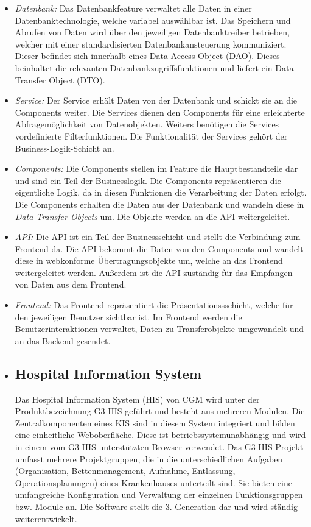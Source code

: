  \begin{itemize}
	


\item \textit {Datenbank:} Das Datenbankfeature verwaltet alle Daten in einer Datenbanktechnologie, welche variabel auswählbar ist. Das Speichern und Abrufen von Daten wird über den jeweiligen Datenbanktreiber betrieben, welcher mit einer standardisierten Datenbankansteuerung kommuniziert. Dieser befindet sich innerhalb eines Data Access Object (DAO). Dieses beinhaltet die relevanten Datenbankzugriffsfunktionen und liefert ein Data Transfer Object (DTO).\\
\item \textit{Service:} Der Service erhält Daten von der Datenbank und schickt sie an die Components weiter. Die Services dienen den Components für eine erleichterte Abfragemöglichkeit von Datenobjekten. Weiters benötigen die Services vordefinierte Filterfunktionen. Die Funktionalität der Services gehört der Business-Logik-Schicht an.\\
\item \textit{Components:} Die Components stellen im Feature die Hauptbestandteile dar und sind ein Teil der Businesslogik. Die Components repräsentieren die eigentliche Logik, da in diesen Funktionen die Verarbeitung der Daten erfolgt. Die Components erhalten die Daten aus der Datenbank und wandeln diese in \textit{Data Transfer Objects} um. Die Objekte werden an die API weitergeleitet.\\
\item \textit{API:} Die API ist ein Teil der Businessschicht und stellt die Verbindung zum Frontend da. Die API bekommt die Daten von den Components und wandelt diese in webkonforme Übertragungsobjekte um, welche an das Frontend weitergeleitet werden. Außerdem ist die API zuständig für das Empfangen von Daten aus dem Frontend.\\
\item \textit{Frontend:} Das Frontend repräsentiert die Präsentationssschicht, welche für den jeweiligen Benutzer sichtbar ist. Im Frontend werden die Benutzerinteraktionen verwaltet, Daten zu Transferobjekte umgewandelt und an das Backend gesendet. \\
\item \subsection{Hospital Information System}
Das Hospital Information System (HIS) von CGM wird unter der Produktbezeichnung G3 HIS geführt und besteht aus mehreren Modulen. Die Zentralkomponenten eines KIS sind in diesem System integriert und bilden eine einheitliche Weboberfläche. Diese ist betriebssystemunabhängig und wird in einem vom G3 HIS unterstützten Browser verwendet. Das G3 HIS Projekt umfasst mehrere Projektgruppen, die in die unterschiedlichen Aufgaben (Organisation, Bettenmanagement, Aufnahme, Entlassung, Operationsplanungen) eines Krankenhauses unterteilt sind. Sie bieten eine umfangreiche Konfiguration und Verwaltung der einzelnen Funktionsgruppen bzw. Module an. Die Software stellt die 3. Generation dar und wird ständig weiterentwickelt.
\end{itemize}










